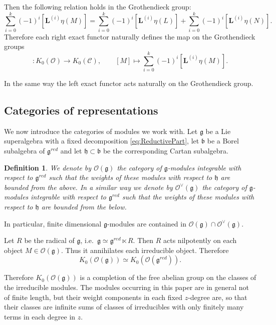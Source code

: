 \documentclass[10pt]{amsart}
\newtheorem{definition}[theorem]{Definition}
\newcommand{\fg}{{\mathfrak g}}
\newcommand{\fb}{{\mathfrak b}}
\newcommand{\fh}{{\mathfrak h}}
\begin{document}
	Then the following relation holds in the Grothendieck group:
	\[\sum_{i=0}^k (-1)^i[\textbf{L}^{(i)}\eta(M)]=\sum_{i=0}^k (-1)^i [\textbf{L}^{(i)}\eta(L)]+\sum_{i=0}^k (-1)^i [\textbf{L}^{(i)}\eta(N)].\]
	Therefore each right exact functor naturally defines the map on the Grothendieck groups
	\begin{equation*}
		[\eta]:K_0(\mathcal{O}) \rightarrow K_0(\mathcal{C}),\qquad [M] \mapsto \sum_{i=0}^k (-1)^i[\textbf{L}^{(i)}\eta(M)].
	\end{equation*}
	
	In the same way the left exact functor acts naturally on the Grothendieck group.
	
	\subsection{Categories of representations}\label{ssec:CategoriesOfRepresentations}
	We now introduce the categories of modules we work with. Let $\fg$ be a Lie superalgebra with a fixed decomposition \eqref{eq:ReductivePart}, let $\fb$ be a Borel subalgebra of $\fg^{red}$ and let $\fh \subset \fb$ be the corresponding Cartan subalgebra.
	
	\begin{definition}\label{def:CategoryO}
		We denote by $\mathcal{O}(\fg)$ the category of $\fg$-modules integrable with respect to $\fg^{red}$ such that the weights of these modules with respect to $\fh$ are bounded from the above. In a similar way we denote by $\mathcal{O}^\vee(\fg)$ the category of $\fg$-modules integrable with respect to $\fg^{red}$ such that the weights of these modules with respect to $\fh$ are bounded from the below.
	\end{definition}
	
	In particular, finite dimensional $\fg$-modules are contained in $\mathcal{O}(\fg) \cap \mathcal{O}^\vee(\fg)$.
	
	Let $R$ be the radical of $\fg$, i.e.\ $\fg \simeq \fg^{red} \ltimes R$. Then $R$ acts nilpotently on each object $M \in \mathcal{O}(\fg)$. Thus it annihilates each irreducible object. Therefore 
	\[K_0(\mathcal{O}(\fg))\simeq K_0(\mathcal{O}(\fg^{red})).\]
	
	Therefore $K_0(\mathcal{O}(\fg))$ is a completion of the free abelian group on the classes of the irreducible modules. The modules occurring in this paper are in general not of finite length, but their weight components in each fixed $z$-degree are, so that their classes are infinite sums of classes of irreducibles with only finitely many terms in each degree in $z$.	
	
\end{document}
